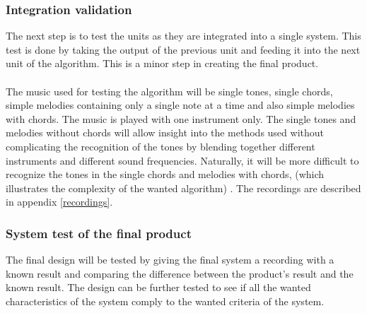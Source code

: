 \subsubsection{Integration validation}
The next step is to test the units as they are integrated into a single system. This test is done by taking the output of the previous unit and feeding it into the next unit of the algorithm. This is a minor step in creating the final product.
\\ \\
The music used for testing the algorithm will be single tones, single chords, simple melodies containing only a single note at a time and also simple melodies with chords. The music is played with one instrument only. The single tones and melodies without chords will allow insight into the methods used without complicating the recognition of the tones by blending together different instruments and different sound frequencies. Naturally, it will be more difficult to recognize the tones in the single chords and melodies with chords, (which illustrates the complexity of the wanted algorithm) . The recordings are described in appendix \ref{recordings}.

\subsubsection{System test of the final product}
The final design will be tested by giving the final system a recording with a known result and comparing the difference between the product's result and the known result. The design can be further tested to see if all the wanted characteristics of the system comply to the wanted criteria of the system.